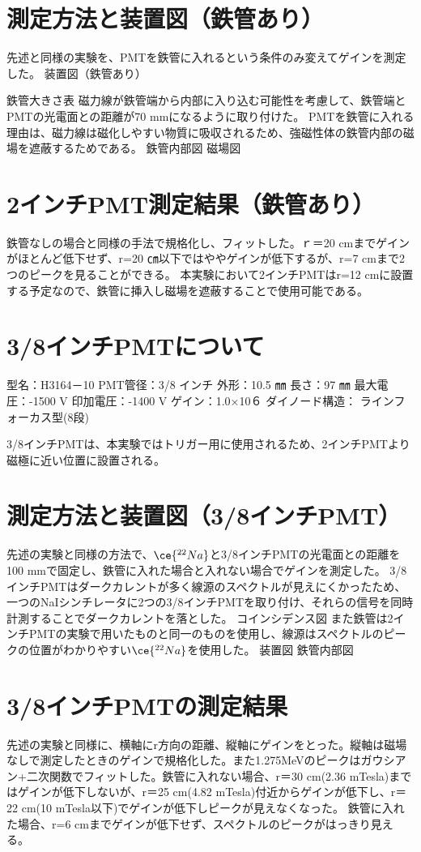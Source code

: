 {\section{測定方法と装置図（鉄管あり）}
先述と同様の実験を、PMTを鉄管に入れるという条件のみ変えてゲインを測定した。
装置図（鉄管あり）

鉄管大きさ表
磁力線が鉄管端から内部に入り込む可能性を考慮して、鉄管端とPMTの光電面との距離が70 mmになるように取り付けた。
PMTを鉄管に入れる理由は、磁力線は磁化しやすい物質に吸収されるため、強磁性体の鉄管内部の磁場を遮蔽するためである。
鉄管内部図
磁場図

\section{2インチPMT測定結果（鉄管あり）}
鉄管なしの場合と同様の手法で規格化し、フィットした。ｒ＝20 cmまでゲインがほとんど低下せず、r=20 ㎝以下ではややゲインが低下するが、r=7 cmまで2つのピークを見ることができる。
本実験において2インチPMTはr=12 cmに設置する予定なので、鉄管に挿入し磁場を遮蔽することで使用可能である。

\section{3/8インチPMTについて}
型名：H3164－10
PMT管径：3/8 インチ
外形：10.5 ㎜
長さ：97 ㎜
最大電圧：-1500 V
印加電圧：-1400 V
ゲイン：1.0×10６
ダイノード構造：
ラインフォーカス型(8段)

3/8インチPMTは、本実験ではトリガー用に使用されるため、2インチPMTより磁極に近い位置に設置される。

\section{測定方法と装置図（3/8インチPMT）}

先述の実験と同様の方法で、$\ce{^{22}Na}$と3/8インチPMTの光電面との距離を100 mmで固定し、鉄管に入れた場合と入れない場合でゲインを測定した。
3/8インチPMTはダークカレントが多く線源のスペクトルが見えにくかったため、一つのNaIシンチレータに2つの3/8インチPMTを取り付け、それらの信号を同時計測することでダークカレントを落とした。
コインシデンス図
また鉄管は2インチPMTの実験で用いたものと同一のものを使用し、線源はスペクトルのピークの位置がわかりやすい$\ce{^{22}Na}$を使用した。
装置図
鉄管内部図

\section{3/8インチPMTの測定結果}
先述の実験と同様に、横軸にr方向の距離、縦軸にゲインをとった。縦軸は磁場なしで測定したときのゲインで規格化した。また1.275MeVのピークはガウシアン+二次関数でフィットした。鉄管に入れない場合、r＝30 cm(2.36 mTesla)まではゲインが低下しないが、r＝25 cm(4.82 mTesla)付近からゲインが低下し、r＝22 cm(10 mTesla以下)でゲインが低下しピークが見えなくなった。
鉄管に入れた場合、r=6 cmまでゲインが低下せず、スペクトルのピークがはっきり見える。

}
